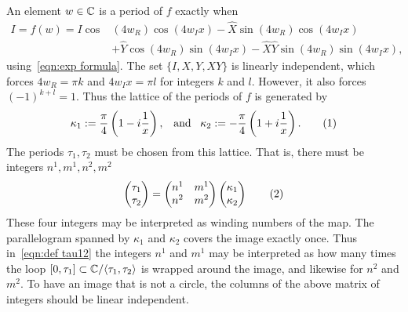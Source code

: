 \documentclass{article}
\begin{document}
An element $w\in\mathbb{C}$ is a period of $f$ exactly when
\begin{align*}
I = f(w) = I \cos&(4 w_R)\cos(4 w_I x)
- \hat{X}\sin(4 w_R)\cos(4 w_I x) \\
&+ \hat{Y}\cos(4 w_R)\sin(4 w_I x)
- \hat{X}\hat{Y}\sin(4w_R)\sin(4 w_I x),
\end{align*}
using~\eqref{eqn:exp formula}. The set $\{I,X,Y,XY\}$ is linearly independent, which forces 
$4w_R = \pi k$ and $4 w_I x = \pi l$ for integers $k$ and $l$. However, it also forces $(-1)^{k+l} = 1$.
Thus the lattice of the periods of $f$ is generated by
\[
\kappa_1 := \frac{\pi}{4}\bra{1 - \iu\frac{1}{x}},
\;\;\;\text{and}\;\;\;
\kappa_2 := -\frac{\pi}{4}\bra{1 + \iu\frac{1}{x}}.
\labelthis{eqn:def kappa12}
\]
The periods $\tau_1,\tau_2$ must be chosen from this lattice.
That is, there must be integers $n^1,m^1,n^2,m^2$
\[
\begin{pmatrix}
\tau_1 \\ \tau_2
\end{pmatrix}
= 
\begin{pmatrix}
n^1 & m^1 \\
n^2 & m^2
\end{pmatrix}
\begin{pmatrix}
\kappa_1 \\ \kappa_2
\end{pmatrix}
\labelthis{eqn:def tau12}
\]
These four integers may be interpreted as winding numbers of the map. The parallelogram spanned by $\kappa_1$ and $\kappa_2$ covers the image exactly once. Thus in~\eqref{eqn:def tau12} the integers $n^1$ and $m^1$ may be interpreted as how many times the loop $[0,\tau_1] \subset \mathbb{C}/\langle \tau_1,\tau_2 \rangle$ is wrapped around the image, and likewise for $n^2$ and $m^2$.
To have an image that is not a circle, the columns of the above matrix of integers should be linear independent. 
\end{document}
